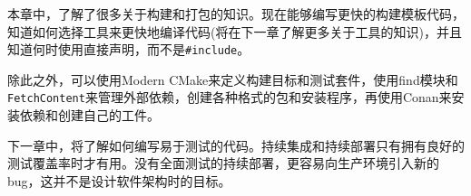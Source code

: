 本章中，了解了很多关于构建和打包的知识。现在能够编写更快的构建模板代码，知道如何选择工具来更快地编译代码(将在下一章了解更多关于工具的知识)，并且知道何时使用直接声明，而不是\texttt{\#include}。

除此之外，可以使用Modern CMake来定义构建目标和测试套件，使用find模块和\texttt{FetchContent}来管理外部依赖，创建各种格式的包和安装程序，再使用Conan来安装依赖和创建自己的工件。

下一章中，将了解如何编写易于测试的代码。持续集成和持续部署只有拥有良好的测试覆盖率时才有用。没有全面测试的持续部署，更容易向生产环境引入新的bug，这并不是设计软件架构时的目标。